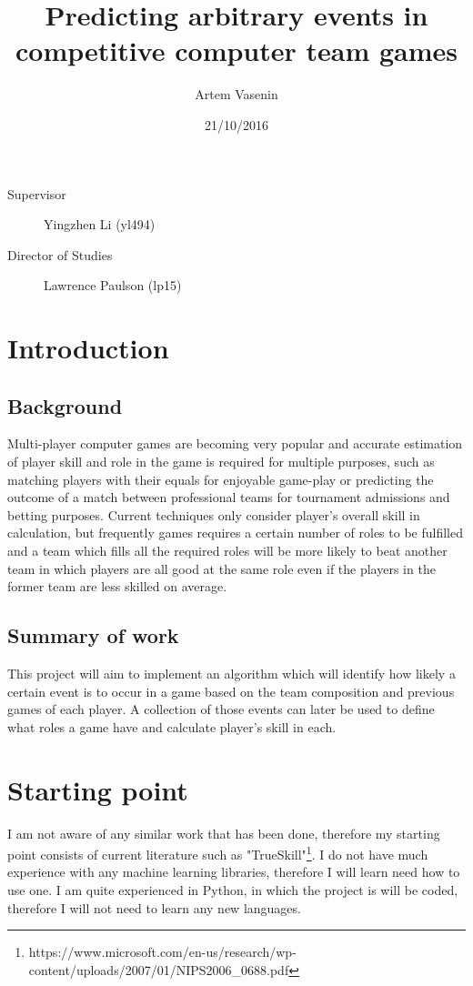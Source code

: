 \documentclass[12pt,a4paper]{article}
\title{Predicting arbitrary events in competitive computer team games}
\date{21/10/2016}
\author{Artem Vasenin}
\begin{document}
\maketitle

\begin{description}
\item
[Supervisor] Yingzhen Li (yl494)
\item
[Director of Studies] Lawrence Paulson (lp15)
\end{description}



\section{Introduction}
\subsection{Background}
Multi-player computer games are becoming very popular and accurate estimation of player skill and role in the game is required for multiple purposes, such as matching players with their equals for enjoyable game-play or predicting the outcome of a match between professional teams for tournament admissions and betting purposes. Current techniques only consider player's overall skill in calculation, but frequently games requires a certain number of roles to be fulfilled and a team which fills all the required roles will be more likely to beat another team in which players are all good at the same role even if the players in the former team are less skilled on average.

\subsection{Summary of work}
This project will aim to implement an algorithm which will identify how likely a certain event is to occur in a game based on the team composition and previous games of each player. A collection of those events can later be used to define what roles a game have and calculate player's skill in each.

\section{Starting point}
I am not aware of any similar work that has been done, therefore my starting point consists of current literature such as "TrueSkill"\footnote{https://www.microsoft.com/en-us/research/wp-content/uploads/2007/01/NIPS2006\_0688.pdf}. I do not have much experience with any machine learning libraries, therefore I will learn need how to use one. I am quite experienced in Python, in which the project is will be coded, therefore I will not need to learn any new languages.
\end{document}
